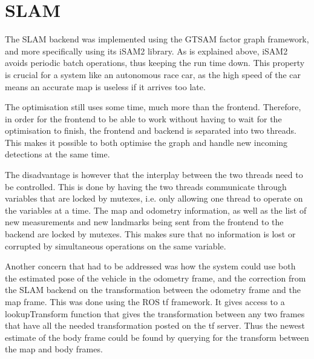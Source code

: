 \section{SLAM}

The SLAM backend was implemented using the GTSAM factor graph framework\cite{GTSAM}, and more specifically using its iSAM2\cite{iSAM2} library. As is explained above, iSAM2 avoids periodic batch operations, thus keeping the run time down. This property is crucial for a system like an autonomous race car, as the high speed of the car means an accurate map is useless if it arrives too late. 

The optimisation still uses some time, much more than the frontend. Therefore, in order for the frontend to be able to work without having to wait for the optimisation to finish, the frontend and backend is separated into two threads. This makes it possible to both optimise the graph and handle new incoming detections at the same time. 

The disadvantage is however that the interplay between the two threads need to be controlled. This is done by having the two threads communicate through variables that are locked by mutexes, i.e. only allowing one thread to operate on the variables at a time. The map and odometry information, as well as the list of new measurements and new landmarks being sent from the frontend to the backend are locked by mutexes. This makes sure that no information is lost or corrupted by simultaneous operations on the same variable. 

Another concern that had to be addressed was how the system could use both the estimated pose of the vehicle in the odometry frame, and the correction from the SLAM backend on the transformation between the odometry frame and the map frame. This was done using the \gls{ROS} tf framework. It gives access to a lookupTransform function that gives the transformation between any two frames that have all the needed transformation posted on the tf server. Thus the newest estimate of the body frame could be found by querying for the transform between the map and body frames. 

\iffalse
\subsubsection{BearingRange factor}

The landmark measurements added to the factor graph are added as bearingrange factors, even though they are really measurements of an $x$ and a $y$ position in the body frame. This is because otherwise the factor had to be implemented ourselves, whereas the BearingRange factor comes with GTSAM. How this affects the system is a bit unknown, but it does seem less than ideal, and is probably something that should be fixed, if only there was time.
\todo[inline]{Remove this section?}
\fi
